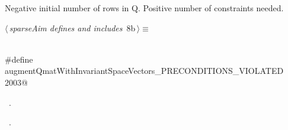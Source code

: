 \documentclass{article}
\begin{document}
\begin{description}
\begin{description}
\begin{flushleft}
\begin{minipage}{\linewidth}
\begin{list}{}{\setlength{\itemsep}{-\parsep}\setlength{\itemindent}{-\leftmargin}}
\item{}
\end{list}
\end{minipage}\vspace{4ex}
\end{flushleft}
\item[{\bf augmentQmatWithInvariantSpaceVectors\_PRECONDITIONS\_VIOLATED}]
Negative initial number of rows in Q. Positive number of constraints needed.
\begin{flushleft} \small
\begin{minipage}{\linewidth}\label{scrap6}\raggedright\small
{} $\langle\,${\itshape sparseAim defines and includes}\nobreak\ {\footnotesize {8b}}$\,\rangle\equiv$
\vspace{-1ex}
\begin{list}{}{} \item
\mbox{}\verb@@\\
\mbox{}\verb@#define augmentQmatWithInvariantSpaceVectors_PRECONDITIONS_VIOLATED 2003@\\
\mbox{}\verb@@{\NWsep}
\end{list}
\vspace{-1.5ex}
\footnotesize
\begin{list}{}{\setlength{\itemsep}{-\parsep}\setlength{\itemindent}{-\leftmargin}}
\item \NWtxtMacroDefBy\ .
\item \NWtxtMacroRefIn\ .


\end{list}
\end{minipage}
\end{flushleft}
\end{description}
\end{description}
\end{document}
